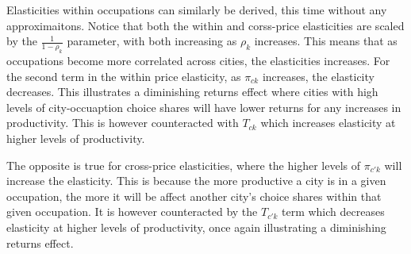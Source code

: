 \documentclass[10pt]{article}
\begin{document}
Elasticities within occupations can similarly be derived, this time without any approximaitons. Notice that both the within and corss-price elasticities are scaled by the $\frac{1}{1 - \rho_k}$ parameter, with both increasing as $\rho_k$ increases. This means that as occupations become more correlated across cities, the elasticities increases. For the second term in the within price elasticity, as $\pi_{ck}$ increases, the elasticity decreases. This illustrates a diminishing returns effect where cities with high levels of city-occuaption choice shares will have lower returns for any increases in productivity. This is however counteracted with $T_{ck}$ which increases elasticity at higher levels of productivity.

The opposite is true for cross-price elasticities, where the higher levels of $\pi_{c'k}$ will increase the elasticity. This is because the more productive a city is in a given occupation, the more it will be affect another city's choice shares within that given occupation. It is however counteracted by the $T_{c'k}$ term which decreases elasticity at higher levels of productivity, once again illustrating a diminishing returns effect.
\end{document}
